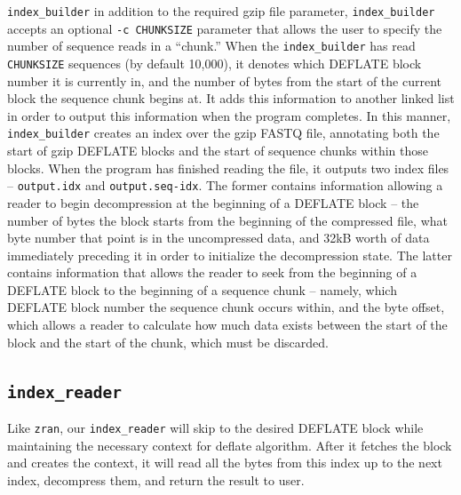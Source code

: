 \documentclass[unnumsec,webpdf,contemporary,large]{oup-authoring-template}
\newcommand{\zran}{\texttt{zran}\xspace}
\newcommand{\ibuilder}{\texttt{index\_builder}\xspace}
\newcommand{\ireader}{\texttt{index\_reader}\xspace}
\newcommand{\gzip}{gzip\xspace}
\begin{document}
\ibuilder in addition to the required \gzip file parameter, \ibuilder accepts an
optional \texttt{-c CHUNKSIZE} parameter that allows the user to specify the
number of sequence reads in a ``chunk.'' When the \ibuilder has read
\texttt{CHUNKSIZE} sequences (by default 10,000), it denotes which DEFLATE block
number it is currently in, and the number of bytes from the start of the current
block the sequence chunk begins at. It adds this information to another linked
list in order to output this information when the program completes. In this
manner, \ibuilder creates an index over the \gzip FASTQ file, annotating both
the start of \gzip DEFLATE blocks and the start of sequence chunks within those
blocks. When the program has finished reading the file, it outputs two index
files -- \texttt{output.idx} and \texttt{output.seq-idx}. The former contains
information allowing a reader to begin decompression at the beginning of a
DEFLATE block -- the number of bytes the block starts from the beginning of the
compressed file, what byte number that point is in the uncompressed data, and
32kB worth of data immediately preceding it in order to initialize the
decompression state. The latter contains information that allows the reader to
seek from the beginning of a DEFLATE block to the beginning of a sequence chunk
-- namely, which DEFLATE block number the sequence chunk occurs within, and the
byte offset, which allows a reader to calculate how much data exists between the
start of the block and the start of the chunk, which must be discarded.

\subsection{\ireader}
\label{sec:ireader}
Like \zran, our \ireader will skip to the desired DEFLATE block while
maintaining the necessary context for deflate algorithm. After it fetches the
block and creates the context, it will read all the bytes from this index up to
the next index, decompress them, and return the result to user.
\end{document}

